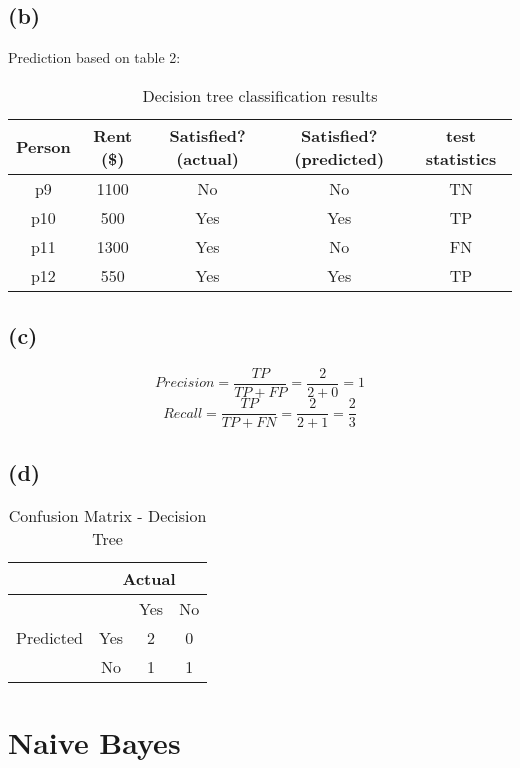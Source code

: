 \documentclass{article}
\begin{document}
\subsection{(b)}
Prediction based on table 2:
\begin{table}[h]
\centering
\begin{tabular}{|c|c|c|c|c|}
\hline
Person & Rent (\$) & Satisfied? (actual) & Satisfied? (predicted) & test statistics \\ \hline
p9     & 1100      & No                  & No                     & TN              \\ \hline
p10    & 500       & Yes                 & Yes                    & TP              \\ \hline
p11    & 1300      & Yes                 & No                     & FN              \\ \hline
p12    & 550       & Yes                 & Yes                    & TP              \\ \hline
\end{tabular}
\caption{Decision tree classification results}
\end{table}

\subsection{(c)}
\[Precision = \frac{TP}{TP+FP} = \frac{2}{2+0} = 1\]
\[Recall = \frac{TP}{TP+FN} = \frac{2}{2+1} = \frac{2}{3}\]

\subsection{(d)}
\begin{table}[t]
\centering
\begin{tabular}{|c|c|c|c|}
\hline
                           & \multicolumn{3}{c|}{Actual} \\ \hline
\multirow{3}{*}{Predicted} &          & Yes     & No     \\ \cline{2-4} 
                           & Yes      & 2       & 0      \\ \cline{2-4} 
                           & No       & 1       & 1      \\ \hline
\end{tabular}
\caption{Confusion Matrix - Decision Tree}
\end{table}


\newpage

\section{Naive Bayes}
\end{document}

